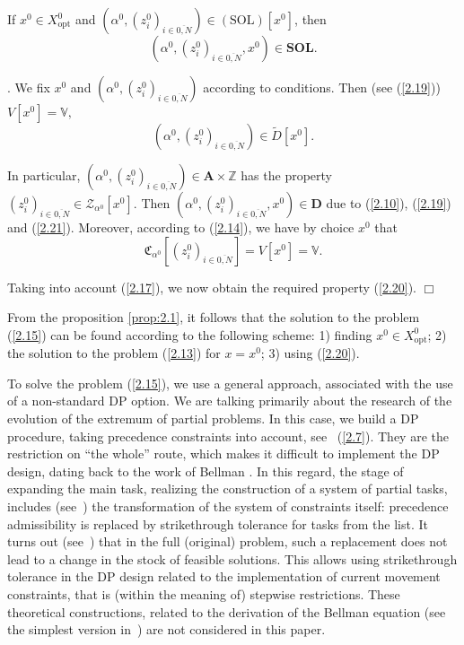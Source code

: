 \begin{theo}
\label{prop:2.1}
If
$x^0 \in X^0_{\mathrm{opt}}$ and $(\alpha^0,(z_i^0)_{i \in \overline{0,N}}) \in (\mathrm{SOL})[x^0]$,
then
\begin{equation}\label{2.20}
  (\alpha^0,(z_i^0)_{i \in \overline{0,N}},x^0) \in \mathbf{SOL}.
\end{equation}
\end{theo}

\doc.
We fix
$x^0$
and
$(\alpha^0,(z_i^0)_{i \in \overline{0,N}})$
according to conditions.
Then
(see (\ref{2.19}))
$V[x^0] = \mathbb{V},$
\begin{equation}\label{2.21}
 (\alpha^0,(z_i^0)_{i \in \overline{0,N}}) \in \tilde{D}[x^0].
\end{equation}

In particular,
$(\alpha^0,(z_i^0)_{i \in \overline{0,N}}) \in \mathbf{A} \times \mathbb{Z}$
has the property
$(z_i^0)_{i \in \overline{0,N}} \in \mathcal{Z}_{\alpha^0}[x^0]$.
Then
$(\alpha^0,(z_i^0)_{i \in \overline{0,N}},x^0) \in \mathbf{D}$
due to
 (\ref{2.10}), (\ref{2.19}) and (\ref{2.21}).
Moreover, according to
 (\ref{2.14}),
we have by choice
$x^0$
that
$$
  \mathfrak{C}_{\alpha^0}[(z_i^0)_{i \in \overline{0,N}}] = V[x^0] = \mathbb{V}.
$$

Taking into account
 (\ref{2.17}),
we now obtain the required property
(\ref{2.20}).
\hfill $\Box$

From the proposition
\ref{prop:2.1},
it follows that
the solution to the problem
 (\ref{2.15})
can be found according to the following scheme:
1) finding $ x ^ 0 \in X ^ 0 _ {\mathrm{opt}}$;
2) the solution to the problem (\ref{2.13}) for $ x = x ^ 0$;
3) using (\ref{2.20}).

To solve the problem
 (\ref{2.15}),
we use a general approach,
associated with the use of a non-standard DP option.
We are talking primarily about the research of
the evolution of the extremum of partial problems.
In this case, we build a DP procedure,
taking precedence constraints into account,
see~ (\ref{2.7}).
They are the restriction on
``the whole''
route,
which makes it difficult to implement the DP design,
dating back to the work of Bellman
\cite{11}.
In this regard,
the stage of expanding the main task,
realizing the construction of a system of partial tasks,
includes
(see~\cite[part 2]{14})
the transformation of the system
of constraints itself:
precedence admissibility
is replaced by strikethrough tolerance
for tasks from the list.
It turns out
(see~\cite[Theorem 2.2.1]{14})
that in the full
(original)
problem,
such a replacement does not lead to
a change in the stock of feasible solutions.
This allows using
strikethrough tolerance
in the DP design
related to the implementation of current movement constraints,
that is
(within the meaning of)
stepwise restrictions.
These theoretical constructions,
related to the derivation of the Bellman equation
(see the simplest version in~\cite[part 3]{14})
are not considered
in this paper.

